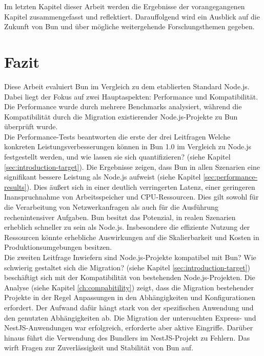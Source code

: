  \label{ch:finalThoughts}
Im letzten Kapitel dieser Arbeit werden die Ergebnisse der vorangegangenen Kapitel zusammengefasst und reflektiert. Darauffolgend wird ein Ausblick auf die Zukunft von Bun und über mögliche weitergehende Forschungsthemen gegeben.

\section{Fazit} \label{sec:finalThoughts-conclusion}
Diese Arbeit evaluiert Bun im Vergleich zu dem etablierten Standard Node.js. Dabei liegt der Fokus auf zwei Hauptaspekten: Performance und Kompatibilität. Die Performance wurde durch mehrere Benchmarks analysiert, während die Kompatibilität durch die Migration existierender Node.js-Projekte zu Bun überprüft wurde.\\

\noindent
Die Performance-Tests beantworten die erste der drei Leitfragen \glqq Welche konkreten Leistungsverbesserungen können in Bun 1.0 im Vergleich zu Node.js festgestellt werden, und wie lassen sie sich quantifizieren?\grqq{} (siehe Kapitel \ref{sec:introduction-target}). Die Ergebnisse zeigen, dass Bun in allen Szenarien eine signifikant bessere Leistung als Node.js aufweist (siehe Kapitel \ref{sec:performance-results}). Dies äußert sich in einer deutlich verringerten Latenz, einer geringeren Inanspruchnahme von Arbeitsspeicher und CPU-Ressourcen. Dies gilt sowohl für die Verarbeitung von Netzwerkanfragen als auch für die Ausführung rechenintensiver Aufgaben. Bun besitzt das Potenzial, in realen Szenarien erheblich schneller zu sein als Node.js. Insbesondere die effiziente Nutzung der Ressourcen könnte erhebliche Auswirkungen auf die Skalierbarkeit und Kosten in Produktionsumgebungen besitzen.\\

\noindent
Die zweiten Leitfrage  \glqq Inwiefern sind Node.js-Projekte kompatibel mit Bun? Wie schwierig gestaltet sich die Migration?\grqq{} (siehe Kapitel \ref{sec:introduction-target}) beschäftigt sich mit der Kompatibilität von bestehenden Node.js-Projekten. Die Analyse (siehe Kapitel \ref{ch:compabitility}) zeigt, dass die Migration bestehender Projekte in der Regel Anpassungen in den Abhängigkeiten und Konfigurationen erfordert. Der Aufwand dafür hängt stark von der spezifischen Anwendung und den genutzten Abhängigkeiten ab. Die Migration der untersuchten Express- und NestJS-Anwendungen war erfolgreich, erforderte aber aktive Eingriffe. Darüber hinaus führt die Verwendung des Bundlers im NestJS-Projekt zu Fehlern. Das wirft Fragen zur Zuverlässigkeit und Stabilität von Bun auf.\\

